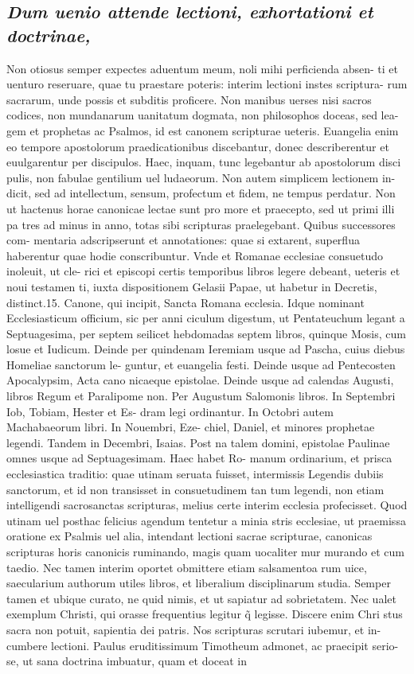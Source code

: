 \documentclass{article}
\begin{document}
\begin{pages}
\subsection*{\textit{Dum uenio attende lectioni, exhortationi et doctrinae, }}\pstart Non otiosus semper expectes aduentum meum, noli mihi perficienda absen- ti et uenturo reseruare, quae tu praestare poteris: interim lectioni instes scriptura- rum sacrarum, unde possis et subditis proficere. Non manibus uerses nisi sacros codices, non mundanarum uanitatum dogmata, non philosophos doceas, sed lea- gem et prophetas ac Psalmos, id est canonem scripturae ueteris. Euangelia enim eo tempore apostolorum praedicationibus discebantur, donec describerentur et euulgarentur per discipulos. Haec, inquam, tunc legebantur ab apostolorum disci pulis, non fabulae gentilium uel ludaeorum. Non autem simplicem lectionem in- dicit, sed ad intellectum, sensum, profectum et fidem, ne tempus perdatur. Non ut hactenus horae canonicae lectae sunt pro more et praecepto, sed ut primi illi pa tres ad minus in anno, totas sibi scripturas praelegebant. Quibus successores com- mentaria adscripserunt et annotationes: quae si extarent, superflua haberentur quae hodie conscribuntur. Vnde et Romanae ecclesiae consuetudo inoleuit, ut cle- rici et episcopi certis temporibus libros legere debeant, ueteris et noui testamen ti, iuxta dispositionem Gelasii Papae, ut habetur in Decretis, distinct.15. Canone, qui incipit, Sancta Romana ecclesia. Idque nominant Ecclesiasticum officium, sic per anni ciculum digestum, ut Pentateuchum legant a Septuagesima, per septem seilicet hebdomadas septem libros, quinque Mosis, cum losue et Iudicum. Deinde per quindenam Ieremiam usque ad Pascha, cuius diebus Homeliae sanctorum le- guntur, et euangelia festi. Deinde usque ad Pentecosten Apocalypsim, Acta cano nicaeque epistolae. Deinde usque ad calendas Augusti, libros Regum et Paralipome non. Per Augustum Salomonis libros. In Septembri Iob, Tobiam, Hester et Es- dram legi ordinantur. In Octobri autem Machabaeorum libri. In Nouembri, Eze- chiel, Daniel, et minores prophetae legendi. Tandem in Decembri, Isaias. Post na talem domini, epistolae Paulinae omnes usque ad Septuagesimam. Haec habet Ro- manum ordinarium, et prisca ecclesiastica traditio: quae utinam seruata fuisset, intermissis Legendis dubiis sanctorum, et id non transisset in consuetudinem tan tum legendi, non etiam intelligendi sacrosanctas scripturas, melius certe interim ecclesia profecisset. Quod utinam uel posthac felicius agendum tentetur a minia stris ecclesiae, ut praemissa oratione ex Psalmis uel alia, intendant lectioni sacrae scripturae, canonicas scripturas horis canonicis ruminando, magis quam uocaliter mur murando et cum taedio. Nec tamen interim oportet obmittere etiam salsamentoa rum uice, saecularium authorum utiles libros, et liberalium disciplinarum studia. Semper tamen et ubique curato, ne quid nimis, et ut sapiatur ad sobrietatem. Nec ualet exemplum Christi, qui orasse frequentius legitur q̃ legisse. Discere enim Chri stus sacra non potuit, sapientia dei patris. Nos scripturas scrutari iubemur, et in- cumbere lectioni. Paulus eruditissimum Timotheum admonet, ac praecipit serio- se, ut sana doctrina imbuatur, quam et doceat in 
\end{pages}
\end{document}
